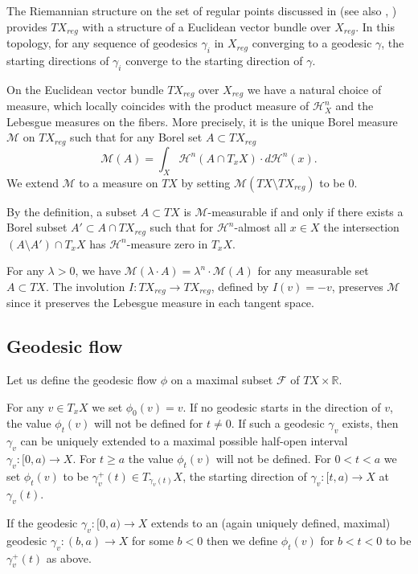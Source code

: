\documentclass[12pt,leqno,intlimits]{amsart}
\numberwithin{equation}{section}
\theoremstyle{definition}
\theoremstyle{remark}
\newcommand{\R}{\mathbb{R}}
\def\:{\colon}
\begin{document}
The Riemannian structure on the set of regular points discussed in \cite{Otsu-Shioya} (see also \cite{Shioya}, \cite{Per-DC}) provides $TX_{reg}$ with a structure of a Euclidean vector bundle over $X_{reg}$. In this topology, for any sequence of geodesics $\gamma _i$ in $X_{reg}$ converging to a geodesic $\gamma$, the starting directions of $\gamma _i$ converge to the starting direction of $\gamma$.

On the Euclidean vector bundle $TX_{reg}$ over $X_{reg}$ we have a natural choice of measure, which locally coincides with the product measure of $\mathcal H^n _X$ and the Lebesgue measures on the fibers. More precisely,
it is the unique Borel measure $\mathcal M$ on $TX_{reg}$ such that for any Borel set $A\subset TX_{reg}$
$$\mathcal M(A)= \int _X \mathcal H^n(A \cap T_x X) \cdot d\mathcal H^n (x).$$
We extend $\mathcal M$ to a measure on $TX$ by setting $\mathcal M(TX\setminus TX_{reg})$ to be $0$.

By the definition, a subset $A\subset TX$ is $\mathcal M$-measurable if and only if there exists a Borel subset $A'\subset A\cap TX_{reg}$ such that
for $\mathcal H^n$-almost all $x\in X$ the intersection $(A\setminus A') \cap T_xX$ has $\mathcal H^n$-measure zero in $T_xX$.

For any $\lambda>0$, we have $\mathcal M(\lambda\cdot A)=\lambda^n\cdot\mathcal M (A)$ for any measurable set $A\subset TX$.
The involution $I\:TX_{reg}\to TX_{reg}$, defined by $I(v)=-v$,
preserves $\mathcal M$
since it preserves the Lebesgue measure in each tangent space.


\subsection{Geodesic flow}
Let us define the geodesic flow $\phi$ on a maximal subset $\mathcal F$ of $TX\times\R$.

For any $v\in T_xX$ we set $\phi _0(v)=v$.
If no geodesic starts in the direction of $v$,
the value $\phi _t(v)$ will not be defined for $t\neq 0$. If such a geodesic $\gamma_v$ exists, then $\gamma_v$ can be uniquely extended to a maximal possible half-open interval $\gamma_v \:[0,a)\to X$. For $t\geq a$
the value $\phi _t(v)$ will not be defined. For $0<t<a$ we set $\phi _t(v)$ to be $\gamma _v ^+ (t) \in T_{\gamma _v(t)} X$, the starting direction of $\gamma_v\:[t,a) \to X$ at $\gamma_v (t)$.

If the geodesic $\gamma _v\:[0,a)\to X$ extends to an (again uniquely defined, maximal) geodesic $\gamma_v\:(b,a) \to X$ for some $b<0$
then we define $\phi _t(v)$ for $b<t<0$ to be $\gamma_v ^+ (t) $ as above.
\end{document}
